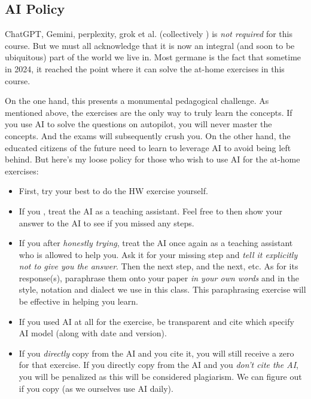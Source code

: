 \subsection*{AI Policy}

ChatGPT, Gemini, perplexity, grok et al. (collectively ) is \emph{not required} for this course. But we must all acknowledge that it is now an integral (and soon to be ubiquitous) part of the world we live in. Most germane is the fact that sometime in 2024, it reached the point where it can solve the at-home exercises in this course. 

On the one hand, this presents a monumental pedagogical challenge. As mentioned above, the exercises are the only way to truly learn the concepts. If you use AI to solve the questions on autopilot, you will never master the concepts. And the exams will subsequently crush you. On the other hand, the educated citizens of the future need to learn to leverage AI to avoid being left behind. But here's my loose policy for those who wish to use AI for the at-home exercises:

\begin{itemize}
\item First, try your best to do the HW exercise yourself. 
\item If you , treat the AI as a teaching assistant. Feel free to then show your answer to the AI to see if you missed any steps.
\item If you  after \emph{honestly trying}, treat the AI once again as a teaching assistant who is allowed to help you. Ask it for your missing step and \emph{tell it explicitly not to give you the answer}. Then the next step, and the next, etc. As for its response(s), paraphrase them onto your paper \emph{in your own words} and in the style, notation and dialect we use in this class. This paraphrasing exercise will be effective in helping you learn.
\item If you used AI at all for the exercise, be transparent and cite which specify AI model (along with date and version).
\item If you \emph{directly} copy from the AI and you cite it, you will still receive a zero for that exercise. If you directly copy from the AI and you \emph{don't cite the AI}, you will be penalized as this will be considered plagiarism. We can figure out if you copy (as we ourselves use AI daily).
\end{itemize}
